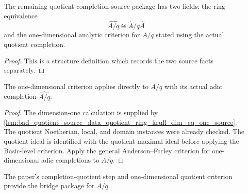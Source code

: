 \begin{definition}
  \label{def:quotient_completion_analytic_bridge}
  The remaining quotient-completion source package has two fields: the
  ring equivalence
  \[
    \widehat{A/q}\cong \widehat A/q\widehat A
  \]
  and the one-dimensional analytic criterion for \(A/q\) stated using the
  actual quotient completion.
\end{definition}

\begin{proof}
  This is a structure definition which records the two source facts separately.
\end{proof}

\begin{lemma}
  \label{lem:quotient_dimension_one_criterion_on_quotient_completion_source}
  The one-dimensional criterion applies directly to \(A/q\) with its actual
  adic completion \(\widehat{A/q}\).
\end{lemma}

\begin{proof}
  The dimension-one calculation is supplied by
  \cref{lem:bad_quotient_source_data_quotient_ring_krull_dim_eq_one_source}.
  The quotient Noetherian, local, and domain instances were already checked.
  The quotient ideal is identified with the quotient maximal ideal before
  applying the Basic-level criterion.
  Apply the general Anderson--Farley criterion for one-dimensional adic
  completions to \(A/q\).
\end{proof}

\begin{lemma}
  \label{lem:quotient_completion_analytic_bridge_source}
  The paper's completion-quotient step and one-dimensional quotient criterion
  provide the bridge package for \(A/q\).
\end{lemma}

